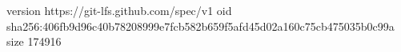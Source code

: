 version https://git-lfs.github.com/spec/v1
oid sha256:406fb9d96c40b78208999e7fcb582b659f5afd45d02a160c75cb475035b0c99a
size 174916
